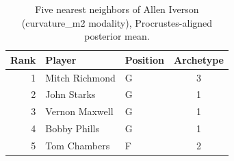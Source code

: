\begin{table}[htbp]
  \centering\small
  \begin{tabular}{rllc}
    \toprule
    Rank & Player & Position & Archetype \\
    \midrule
    1 & Mitch Richmond & G & 3 \\
    2 & John Starks & G & 1 \\
    3 & Vernon Maxwell & G & 1 \\
    4 & Bobby Phills & G & 1 \\
    5 & Tom Chambers & F & 2 \\
    \bottomrule
  \end{tabular}
  \caption{Five nearest neighbors of Allen Iverson (curvature_m2 modality), Procrustes-aligned posterior mean.}
  \label{tab:Allen_Iverson_neighbors_curvature_m2}
\end{table}

